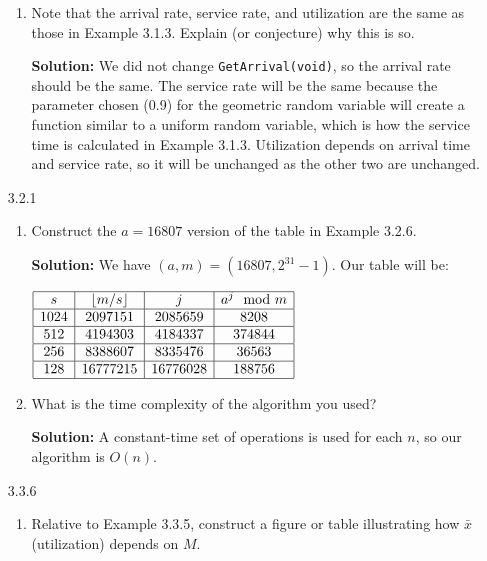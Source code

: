 \documentclass[11pt]{article} %
\begin{document}
\begin{enumerate}
\begin{enumerate}
\item Note that the arrival rate, service rate, and utilization are the same as those in Example 3.1.3.  Explain (or conjecture) why this is so.

{\bf Solution:} We did not change \texttt{GetArrival(void)}, so the arrival rate should be the same.  The service rate will be the same because the parameter chosen (0.9) for the geometric random variable will create a function similar to a uniform random variable, which is how the service time is calculated in Example 3.1.3.  Utilization depends on arrival time and service rate, so it will be unchanged as the other two are unchanged.

\end{enumerate}

\newpage

\item[3.2.1] \begin{enumerate}

\item Construct the $a = 16807$ version of the table in Example 3.2.6.

{\bf Solution:} We have $(a, m) = (16807, 2^{31}-1)$.  Our table will be:

\begin{center}$\begin{array}{|c|c|c|c|}\hline
s & \lfloor m/s\rfloor & j & a^j\mod m\\\hline
1024 & 2097151 & 2085659 & 8208 \\\hline
512 & 4194303 & 4184337 & 374844 \\\hline
256 & 8388607 & 8335476 & 36563 \\\hline
128 & 16777215 & 16776028 & 188756 \\\hline
\end{array}$\end{center}

\item What is the time complexity of the algorithm you used?

{\bf Solution:} A constant-time set of operations is used for each $n$, so our algorithm is $O(n)$.

\end{enumerate}

\item[3.3.6] \begin{enumerate}

\item Relative to Example 3.3.5, construct a figure or table illustrating how $\bar{x}$ (utilization) depends on $M$.


\end{enumerate}
\end{enumerate}
\end{document}
